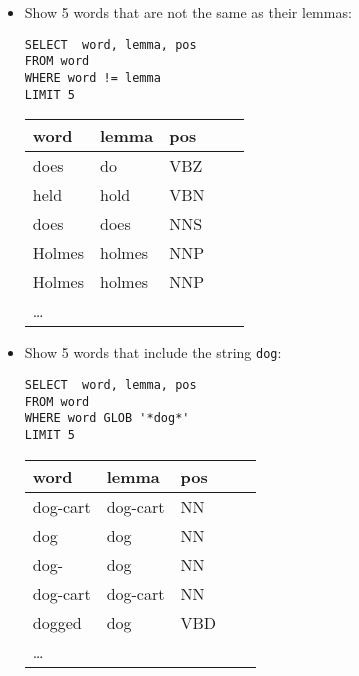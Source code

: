 \documentclass[a4paper,landscape,headrule,footrule,dvips]{foils}
\begin{document}
\begin{CJK}{UTF8}{min}
\begin{itemize}
\end{itemize}


\begin{itemize}
\item Show 5 words that are not the same as their lemmas:
\begin{verbatim}
SELECT  word, lemma, pos
FROM word
WHERE word != lemma
LIMIT 5
\end{verbatim}
  \begin{tabular}{lllll}
    \textbf{word}  & \textbf{lemma}  &  \textbf{pos} \\ \hline
    does  & do &  VBZ \\
    held  & hold &  VBN \\
    does & does &  NNS \\
    Holmes & holmes & NNP \\
    Holmes & holmes & NNP \\
    \ldots
  \end{tabular}
\end{itemize}


\begin{itemize}
\item Show 5 words that include the string \texttt{dog}:
\begin{verbatim}
SELECT  word, lemma, pos
FROM word
WHERE word GLOB '*dog*'
LIMIT 5
\end{verbatim}
  \begin{tabular}{lllll}
    \textbf{word}  & \textbf{lemma}  &  \textbf{pos} \\ \hline
dog-cart   & dog-cart   &  NN      \\  
dog        & dog        &  NN    \\    
dog-       & dog        &  NN   \\     
dog-cart   & dog-cart   &  NN   \\     
dogged     & dog        &  VBD   \\
    \ldots
  \end{tabular}
\end{itemize}



\end{CJK}
\end{document}
